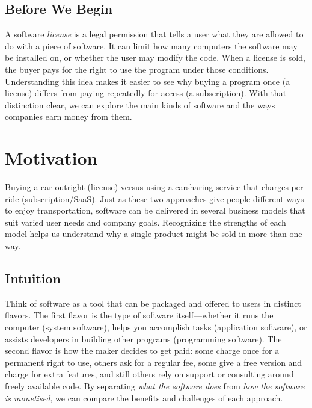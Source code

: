 \documentclass[12pt, a4paper]{article}
\begin{document}
\subsection{Before We Begin}
A software \emph{license} is a legal permission that tells a user what they are allowed to do with a piece of software. It can limit how many computers the software may be installed on, or whether the user may modify the code. When a license is sold, the buyer pays for the right to use the program under those conditions. Understanding this idea makes it easier to see why buying a program once (a license) differs from paying repeatedly for access (a subscription). With that distinction clear, we can explore the main kinds of software and the ways companies earn money from them.

\section{Motivation}
Buying a car outright (license) versus using a carsharing service that charges per ride (subscription/SaaS).  Just as these two approaches give people different ways to enjoy transportation, software can be delivered in several business models that suit varied user needs and company goals. Recognizing the strengths of each model helps us understand why a single product might be sold in more than one way.

\subsection{Intuition}
Think of software as a tool that can be packaged and offered to users in distinct flavors.  The first flavor is the type of software itself---whether it runs the computer (system software), helps you accomplish tasks (application software), or assists developers in building other programs (programming software). The second flavor is how the maker decides to get paid: some charge once for a permanent right to use, others ask for a regular fee, some give a free version and charge for extra features, and still others rely on support or consulting around freely available code. By separating \emph{what the software does} from \emph{how the software is monetised}, we can compare the benefits and challenges of each approach.
\end{document}
